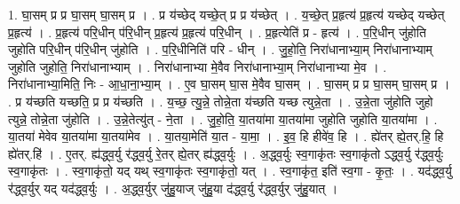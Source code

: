 \documentclass[17pt]{extarticle}
\begin{document}
1. घा॒सम् प्र प्र घा॒सम् घा॒सम् प्र । . प्र य॑च्छेद् यच्छे॒त् प्र प्र य॑च्छेत् । . य॒च्छे॒त् प्र॒हृत्य॑ प्र॒हृत्य॑ यच्छेद् यच्छेत् प्र॒हृत्य॑ । . प्र॒हृत्य॑ परि॒धीन् प॑रि॒धीन् प्र॒हृत्य॑ प्र॒हृत्य॑ परि॒धीन् । . प्र॒हृत्येति॑ प्र - हृत्य॑ । . प॒रि॒धीन् जु॑होति जुहोति परि॒धीन् प॑रि॒धीन् जु॑होति । . प॒रि॒धीनिति॑ परि - धीन् । . जु॒हो॒ति॒ निरा॑धानाभ्या॒म् निरा॑धानाभ्याम् जुहोति जुहोति॒ निरा॑धानाभ्याम् । . निरा॑धानाभ्या मे॒वैव निरा॑धानाभ्या॒म् निरा॑धानाभ्या मे॒व । . निरा॑धानाभ्या॒मिति॒ निः - आ॒धा॒ना॒भ्या॒म् । . ए॒व घा॒सम् घा॒स मे॒वैव घा॒सम् । . घा॒सम् प्र प्र घा॒सम् घा॒सम् प्र । . प्र य॑च्छति यच्छति॒ प्र प्र य॑च्छति । . य॒च्छ॒ त्यु॒न्ने॒ तोन्ने॒ता य॑च्छति यच्छ त्युन्ने॒ता । . उ॒न्ने॒ता जु॑होति जुहो त्युन्ने॒ तोन्ने॒ता जु॑होति । . उ॒न्ने॒तेत्यु॑त् - ने॒ता । . जु॒हो॒ति॒ या॒तया॑मा या॒तया॑मा जुहोति जुहोति या॒तया॑मा । . या॒तया॑ मेवेव या॒तया॑मा या॒तया॑मेव । . या॒तया॒मेति॑ या॒त - या॒मा॒ । . इ॒व॒ हि हीवे॑व॒ हि । . ह्ये॑तर् ह्ये॒तर्.हि॒ हि ह्ये॑तर्.हि॑ । . ए॒तर्. ह्य॑द्ध्व॒र्यु र॑द्ध्व॒र्यु रे॒तर् ह्ये॒तर् ह्य॑द्ध्व॒र्युः । . अ॒द्ध्व॒र्युः स्व॒गाकृ॑तः स्व॒गाकृ॑तो ऽद्ध्व॒र्यु र॑द्ध्व॒र्युः स्व॒गाकृ॑तः । . स्व॒गाकृ॑तो॒ यद् यथ् स्व॒गाकृ॑तः स्व॒गाकृ॑तो॒ यत् । . स्व॒गाकृ॑त॒ इति॑ स्व॒गा - कृ॒तः॒ । . यद॑द्ध्व॒र्यु र॑द्ध्व॒र्युर् यद् यद॑द्ध्व॒र्युः । . अ॒द्ध्व॒र्युर् जु॑हु॒याज् जु॑हु॒या द॑द्ध्व॒र्यु र॑द्ध्व॒र्युर् जु॑हु॒यात् । \newline
\end{document}
